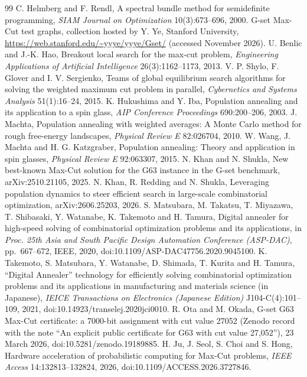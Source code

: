 \documentclass[11pt]{article}
\begin{document}
\begin{thebibliography}{99}
 C. Helmberg and F. Rendl, A spectral bundle method for semidefinite programming, \emph{SIAM Journal on Optimization} 10(3):673--696, 2000.
 G-set Max-Cut test graphs, collection hosted by Y. Ye, Stanford University, \url{https://web.stanford.edu/~yyye/yyye/Gset/} (accessed November 2026).
 U. Benlic and J.-K. Hao, Breakout local search for the max-cut problem, \emph{Engineering Applications of Artificial Intelligence} 26(3):1162--1173, 2013.
 V. P. Shylo, F. Glover and I. V. Sergienko, Teams of global equilibrium search algorithms for solving the weighted maximum cut problem in parallel, \emph{Cybernetics and Systems Analysis} 51(1):16--24, 2015.
 K. Hukushima and Y. Iba, Population annealing and its application to a spin glass, \emph{AIP Conference Proceedings} 690:200--206, 2003.
 J. Machta, Population annealing with weighted averages: A Monte Carlo method for rough free-energy landscapes, \emph{Physical Review E} 82:026704, 2010.
 W. Wang, J. Machta and H. G. Katzgraber, Population annealing: Theory and application in spin glasses, \emph{Physical Review E} 92:063307, 2015.
 N. Khan and N. Shukla, New best-known Max-Cut solution for the G63 instance in the G-set benchmark, arXiv:2510.21105, 2025.
 N. Khan, R. Redding and N. Shukla, Leveraging population dynamics to steer efficient search in large-scale combinatorial optimization, arXiv:2606.25203, 2026.
 S. Matsubara, M. Takatsu, T. Miyazawa, T. Shibasaki, Y. Watanabe, K. Takemoto and H. Tamura, Digital annealer for high-speed solving of combinatorial optimization problems and its applications, in \emph{Proc. 25th Asia and South Pacific Design Automation Conference (ASP-DAC)}, pp.~667--672, IEEE, 2020, doi:10.1109/ASP-DAC47756.2020.9045100.
 K. Takemoto, S. Matsubara, Y. Watanabe, D. Shimada, T. Kurita and H. Tamura, ``Digital Annealer'' technology for efficiently solving combinatorial optimization problems and its applications in manufacturing and materials science (in Japanese), \emph{IEICE Transactions on Electronics (Japanese Edition)} J104-C(4):101--109, 2021, doi:10.14923/transelej.2020jci0010.
 R. Ota and M. Okada, G-set G63 Max-Cut certificate: a 7000-bit assignment with cut value 27052 (Zenodo record with the note ``An explicit public certificate for G63 with cut value 27,052''), 23 March 2026, doi:10.5281/zenodo.19189885.
 H. Ju, J. Seol, S. Choi and S. Hong, Hardware acceleration of probabilistic computing for Max-Cut problems, \emph{IEEE Access} 14:132813--132824, 2026, doi:10.1109/ACCESS.2026.3727846.
\end{thebibliography}
\end{document}
